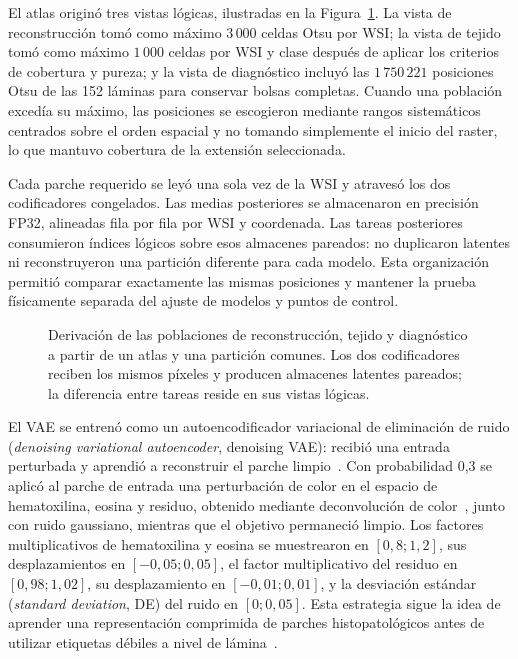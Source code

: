 El atlas originó tres vistas lógicas, ilustradas en la
Figura~\ref{fig:vistas-logicas-datos}. La vista de reconstrucción tomó como
máximo \(3\,000\) celdas Otsu por WSI; la vista de tejido tomó como máximo
\(1\,000\) celdas por WSI y clase después de aplicar los criterios de cobertura
y pureza; y la vista de diagnóstico incluyó las \(1\,750\,221\) posiciones Otsu
de las 152 láminas para conservar bolsas completas. Cuando una población
excedía su máximo, las posiciones se escogieron mediante rangos sistemáticos
centrados sobre el orden espacial y no tomando simplemente el inicio del
raster, lo que mantuvo cobertura de la extensión seleccionada.

Cada parche requerido se leyó una sola vez de la WSI y atravesó los dos
codificadores congelados. Las medias posteriores se almacenaron en precisión
FP32, alineadas fila por fila por WSI y coordenada. Las tareas posteriores
consumieron índices lógicos sobre esos almacenes pareados: no duplicaron
latentes ni reconstruyeron una partición diferente para cada modelo. Esta
organización permitió comparar exactamente las mismas posiciones y mantener la
prueba físicamente separada del ajuste de modelos y puntos de control.

\begin{figure}[htbp]
    \centering
    \resizebox{\textwidth}{!}{}
    \caption{Derivación de las poblaciones de reconstrucción, tejido y
    diagnóstico a partir de un atlas y una partición comunes. Los dos
    codificadores reciben los mismos píxeles y producen almacenes latentes
    pareados; la diferencia entre tareas reside en sus vistas lógicas.}
    \label{fig:vistas-logicas-datos}
\end{figure}

El VAE se entrenó como un autoencodificador variacional de eliminación de ruido
(\emph{denoising variational autoencoder}, denoising VAE): recibió una entrada
perturbada y aprendió a reconstruir el parche limpio~\cite{im_denoising_2017}. Con
probabilidad 0,3 se aplicó al parche de entrada una perturbación de color en el
espacio de hematoxilina, eosina y residuo, obtenido mediante deconvolución de
color~\cite{ruifrok_color_2001}, junto con ruido gaussiano, mientras que el
objetivo permaneció limpio. Los factores multiplicativos de hematoxilina y
eosina se muestrearon en \([0,8;1,2]\), sus desplazamientos en
\([-0,05;0,05]\), el factor multiplicativo del residuo en \([0,98;1,02]\), su
desplazamiento en \([-0,01;0,01]\), y la desviación estándar (\emph{standard deviation}, DE) del ruido en
\([0;0,05]\). Esta
estrategia sigue la idea de aprender una representación comprimida de parches
histopatológicos antes de utilizar etiquetas débiles a nivel de
lámina~\cite{tellez_neural_2021}.

